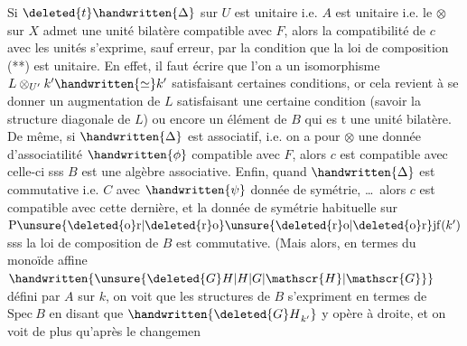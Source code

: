 Si $\deleted{t}\handwritten{\Delta}$ sur $U$ est unitaire i.e. $A$ est unitaire i.e. le $\otimes$ sur $X$  admet une unité bilatère compatible avec $F$, alors la compatibilité de $c$ avec les unités s'exprime, sauf erreur, par la condition que la loi de composition (**) est unitaire.\deleted{(} En effet, il faut écrire que l'on a un isomorphisme  $L\otimes_{U'}k'\handwritten{\simeq}k'$ satisfaisant certaines conditions, or cela revient à se donner un augmentation de $L$ satisfaisant une certaine condition (savoir  la structure diagonale de $L$) ou encore un élément de $B$ qui es t une unité bilatère. De même, si $\handwritten{\Delta}$ est associatif, i.e. on a pour $\otimes$ une donnée d'associatilité $\handwritten{\phi}$ compatible avec $F$, alors $c$ est compatible avec celle-ci sss $B$ est une algèbre associative.  Enfin, quand $\handwritten{\Delta}$ est commutative i.e. $C$ avec $\handwritten{\psi}$ donnée de symétrie, \ldots\ alors $c$ est compatible avec cette dernière, et la donnée de symétrie habituelle sur $\mathrm{P}\unsure{\deleted{\mathrm{o}}\mathrm{r}|\deleted{\mathrm{r}}\mathrm{o}}\unsure{\deleted{\mathrm{r}}\mathrm{o}|\deleted{\mathrm{o}}\mathrm{r}}\mathrm{jf}(k')$ sss la loi de composition de $B$ est  commutative. \handwritten{[}(Mais alors, en termes du monoïde affine $\handwritten{\unsure{\deleted{G}H|H|G|\mathscr{H}|\mathscr{G}}}$ défini par $A$ sur $k$, on voit que les structures de $B$ s'expriment en termes de $\mathrm{Spec}\ B$ en disant que $\handwritten{{\deleted{G}H}_{k'}}$ y opère à droite, et on voit de plus qu'après le changemen
